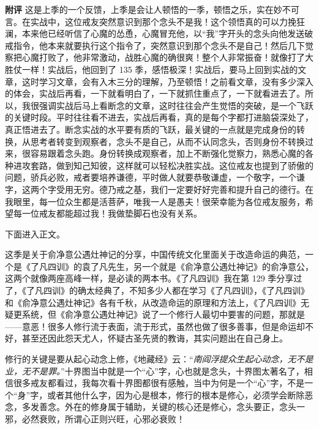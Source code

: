 \begin{case}
    \textbf{附评} 这是上季的一个反馈，上季是会让人顿悟的一季，顿悟之乐，实在妙不可言。在实战中，这位戒友突然意识到那个念头不是我！这个领悟真的可以力挽狂澜，本来他已经听信了心魔的怂恿，心魔冒充他，以“我”字开头的念头向他发送破戒指令，他本来就要执行这个指令了，突然意识到那个念头不是自己！然后几下觉察把心魔打败了，他非常激动，战胜心魔的确很爽！整个人非常振奋！就像打了大胜仗一样！实战后，他回到了 135 季，感悟极深！实战后，要马上回到实战的文章，这时学习文章，会有入木三分的理解，乃至顿悟！之前看文章，没有多少深入的体会，实战后再看，一下就看明白了，一下就抓住重点了，一下就看进去了。所以，我很强调实战后马上看断念的文章，这时往往会产生觉悟的突破，是一个飞跃的关键时段。平时往往看不进去，实战后再看，真的是每个字都打进脑袋深处了，真正悟进去了。断念实战的水平要有质的飞跃，最关键的一点就是完成身份的转换，从思考者转变到观察者，念头不是自己，从而不认同念头，否则身份不转换过来，很容易跟着念头跑。身份转换成观察者，加上不断强化觉察力，熟悉心魔的各种进攻套路，做到知己知彼，这样就可以轻松决胜实战。这位戒友也提到了骄傲的问题，骄兵必败，戒者要培养谦德，平时做人就要恭敬谦虚，一个敬字，一个谦字，这两个字受用无穷。德乃戒之基，我们一定要好好完善和提升自己的德行。在我眼里，每一位众生都是活菩萨，唯我一人是愚夫！很荣幸能为各位戒友服务，希望每一位戒友都能超过我！我做垫脚石也没有关系。
\end{case}

下面进入正文。

这季是关于俞净意公遇灶神记的分享，中国传统文化里面关于改造命运的典范，一个是《了凡四训》的袁了凡先生，另一个就是《俞净意公遇灶神记》的俞净意公，这两个就像两座高峰一样，是必读的两本书。《了凡四训》我在第 129 季分享过了，《了凡四训》的确太经典了，不知多少人都在学习《了凡四训》，《了凡四训》和《俞净意公遇灶神记》各有千秋，从改造命运的原理和方法上，《了凡四训》无疑更系统，但《俞净意公遇灶神记》说了一个修行人最切中要害的问题，那就是——意恶！很多人修行流于表面，流于形式，虽然也做了很多善事，但是命运却不好，甚至还因此怨天尤人，怀疑古圣先贤的教诲，其实问题出在自己身上。

修行的关键是要从起心动念上修，《地藏经》云：“\textit{南阎浮提众生起心动念，无不是业，无不是罪。}”十界图当中就是一个“心”字，心也就是念头，十界图太著名了，相信很多戒友都看过，我每次看十界图都很有感触，当中为何是一个“心”字，不是一个“身”字，或者其他什么字，因为心是根本，修行的根本是修心，必须学会断除恶念，多发善念。外在的修身属于辅助，关键的核心还是修心，念头要正，念头一邪，必然衰败，所谓心正则兴旺，心邪必衰败！

